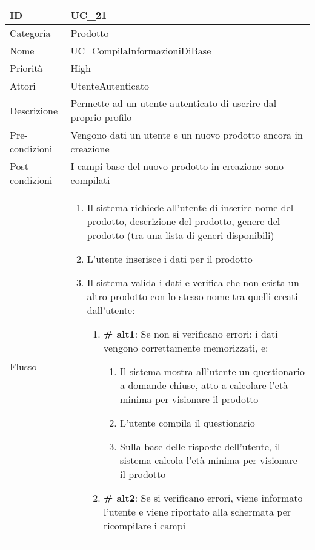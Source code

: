 \begin{center}
\begin{tabular}{ |p{2cm}|p{13cm}|  }
\hline
ID & UC\_21\\\hline
Categoria & Prodotto \\\hline
Nome & UC\_CompilaInformazioniDiBase \\\hline
Priorità & High \\\hline
Attori &  UtenteAutenticato \\\hline
Descrizione & Permette ad un utente autenticato di uscrire dal proprio profilo \\\hline
Pre-condizioni &  Vengono dati un utente e un nuovo prodotto ancora in creazione\\\hline
Post-condizioni &  I campi base del nuovo prodotto in creazione sono compilati\\\hline
Flusso &  	\begin{enumerate}
			\item Il sistema richiede all'utente di inserire nome del prodotto, descrizione del prodotto, genere del prodotto (tra una lista di generi disponibili)
			\item L'utente inserisce i dati per il prodotto
			\item Il sistema valida i dati e verifica che non esista un altro prodotto con lo stesso nome tra quelli creati dall'utente:
			\begin{enumerate}[  ]
				\item \textbf{\# alt1}: Se non si verificano errori: i dati vengono correttamente memorizzati, e:
				\begin{enumerate}[label*=\arabic*.]
					\item Il sistema mostra all'utente un questionario a domande chiuse, atto a calcolare l'età minima per visionare il prodotto
					\item L'utente compila il questionario
					\item Sulla base delle risposte dell'utente, il sistema calcola l'età minima per visionare il prodotto
				\end{enumerate}
				\item \textbf{\# alt2}: Se si verificano errori, viene informato l'utente e viene riportato alla schermata per ricompilare i campi
			\end{enumerate}
		\end{enumerate}\\\hline
\end{tabular}
\label{table_use_case:21}\newline


\end{center}
